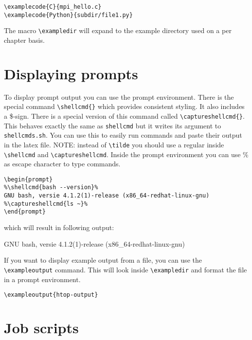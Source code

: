 \documentclass[11pt,a4paper]{article}
\begin{document}
\begin{verbatim}
\examplecode{C}{mpi_hello.c}
\examplecode{Python}{subdir/file1.py}
\end{verbatim}


The macro \verb|\exampledir| will expand to the example directory used on a per
chapter basis.

\section{Displaying prompts}
\label{sec:displaying-prompts}

To display prompt output you can use the prompt environment. There is the
special command \verb|\shellcmd{}| which provides consistent styling. It also
includes a \$-sign. There is a special version of this command called
\verb|\captureshellcmd{}|. This behaves exactly the same as \verb|shellcmd| but
it writes its argument to \verb|shellcmds.sh|. You can use this to easily run
commands and paste their output in the latex file. NOTE: instead of
\verb|\tilde| you should use a regular \tilde inside \verb|\shellcmd| and
\verb|\captureshellcmd|. Inside the prompt environment you can use \% as escape
character to type commands.

\begin{verbatim}
\begin{prompt}
%\shellcmd{bash --version}%
GNU bash, versie 4.1.2(1)-release (x86_64-redhat-linux-gnu)
%\captureshellcmd{ls ~}%
\end{prompt}
\end{verbatim}

which will result in following output:
\begin{prompt}
GNU bash, versie 4.1.2(1)-release (x86_64-redhat-linux-gnu)
\end{prompt}

If you want to display example output from a file, you can use the
\verb|\exampleoutput| command. This will look inside \verb|\exampledir| and
format the file in a prompt environment.

\begin{verbatim}
\exampleoutput{htop-output}
\end{verbatim}

\section{Job scripts}
\label{sec:job-scripts}
\end{document}
